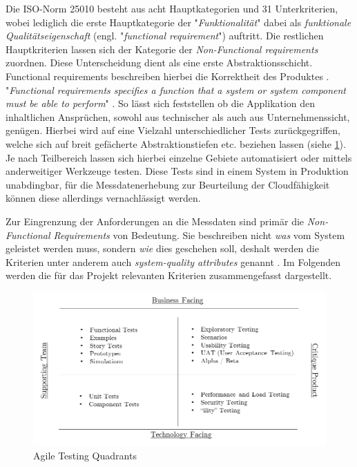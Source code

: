 Die ISO-Norm 25010 besteht aus acht Hauptkategorien und 31 Unterkriterien, wobei lediglich die erste Hauptkategorie der "\emph{Funktionalität}" dabei als \emph{funktionale Qualitätseigenschaft} (engl. "\emph{functional requirement}") auftritt. Die restlichen Hauptkriterien lassen sich der Kategorie der \emph{Non-Functional requirements} zuordnen. Diese Unterscheidung dient als eine erste Abstraktionsschicht. Functional requirements beschreiben hierbei die Korrektheit des Produktes \cite[Seite~335]{continuous-delivery}. "\emph{Functional requirements specifies a function that a system or system component must
be able to perform}" \cite[Seite~19]{eide-requirements}. So lässt sich feststellen ob die Applikation den inhaltlichen Ansprüchen, sowohl aus technischer als auch aus Unternehmenssicht, genügen. Hierbei wird auf eine Vielzahl unterschiedlicher Tests zurückgegriffen, welche sich auf breit gefächerte Abstraktionstiefen etc. beziehen lassen (siehe \ref{fig:testing-quad}). Je nach Teilbereich lassen sich hierbei einzelne Gebiete automatisiert oder mittels anderweitiger Werkzeuge testen. Diese Tests sind in einem System in Produktion unabdingbar, für die Messdatenerhebung zur Beurteilung der Cloudfähigkeit können diese allerdings vernachlässigt werden. 

Zur Eingrenzung der Anforderungen an die Messdaten sind primär die \emph{Non-Functional Requirements} von Bedeutung. Sie beschreiben nicht \emph{was} vom System geleistet werden muss, sondern \emph{wie} dies geschehen soll, deshalt werden die Kriterien unter anderem auch \emph{system-quality attributes} genannt \cite[Seite~335]{continuous-delivery}. Im Folgenden werden die für das Projekt relevanten Kriterien zusammengefasst dargestellt.

\begin{figure}[h!]
	\centering
	\includegraphics[width=\linewidth]{kapitel/vorgehensmodell/kriterienkatalog/_img/agile-testing-quadrants}
	\caption[Agile Testing Quadrants]{Agile Testing Quadrants}
	\label{fig:testing-quad}
\end{figure}




